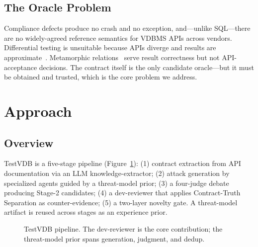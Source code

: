 \documentclass[sigconf, anonymous, review]{acmart}
\begin{document}
\subsection{The Oracle Problem}
Compliance defects produce no crash and no exception, and---unlike SQL---there are no widely-agreed reference semantics for VDBMS APIs across vendors. Differential testing is unsuitable because APIs diverge and results are approximate~\cite{roadmap25}. Metamorphic relations~\cite{metmap24} serve result correctness but not API-acceptance decisions. The contract itself is the only candidate oracle---but it must be obtained and trusted, which is the core problem we address.

\section{Approach}\label{sec:approach}

\subsection{Overview}
TestVDB is a five-stage pipeline (Figure~\ref{fig:overview}): (1) contract extraction from API documentation via an LLM knowledge-extractor; (2) attack generation by specialized agents guided by a threat-model prior; (3) a four-judge debate producing Stage-2 candidates; (4) a dev-reviewer that applies Contract-Truth Separation as counter-evidence; (5) a two-layer novelty gate. A threat-model artifact is reused across stages as an experience prior.

\begin{figure}[t]
\centering
{}
\caption{TestVDB pipeline. The dev-reviewer is the core contribution; the threat-model prior spans generation, judgment, and dedup.}
\label{fig:overview}
\end{figure}
\end{document}
